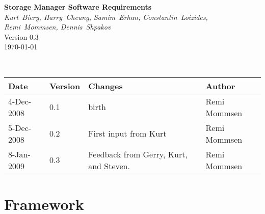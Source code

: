 \documentclass[]{article}
\begin{document}

\begin{titlepage}

\begin{center}
{\Large\bf Storage Manager Software Requirements} \\
\medskip
{\it Kurt~Biery, Harry~Cheung, Samim~Erhan, Constantin~Loizides, Remi~Mommsen, Dennis~Shpakov} \\
\bigskip
Version 0.3 \\
\today \\
\bigskip
\end{center}

\begin{abstract}
This document collects the requirements for the Storage Manager (SM) application.
\end{abstract}

\end{titlepage}
\newpage

 \\

\begin{tabular}{l l p{1.9in} p{1.2in}}
{\bf Date}     &{\bf Version} &{\bf Changes} &{\bf Author}\\
\hline         
4-Dec-2008     &0.1           &birth                  &Remi Mommsen\\
5-Dec-2008     &0.2           &First input from Kurt  &Remi Mommsen\\
8-Jan-2009     &0.3           &Feedback from Gerry, Kurt, and Steven.  &Remi Mommsen\\
\end{tabular}

\newpage

\tableofcontents

\newpage

\section{Framework}
\end{document}
